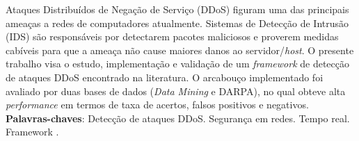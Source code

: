\setlength{\absparsep}{18pt} %
\begin{resumo}
      Ataques Distribuídos de Negação de Serviço (DDoS) figuram uma das principais ameaças a redes de computadores atualmente. Sistemas de Detecção de Intrusão (IDS) são responsáveis por detectarem pacotes maliciosos e proverem medidas cabíveis para que a ameaça não cause maiores danos ao servidor/\textit{host}. O presente trabalho visa o estudo, implementação e validação de um \textit{framework} de detecção de ataques DDoS encontrado na literatura. O arcabouço implementado foi avaliado por duas bases de dados (\textit{Data Mining} e DARPA), no qual obteve alta \textit{performance} em termos de taxa de acertos, falsos positivos e negativos. 
\textbf{Palavras-chaves}: Detecção de ataques DDoS. Segurança em redes. Tempo real. Framework .
\end{resumo}
